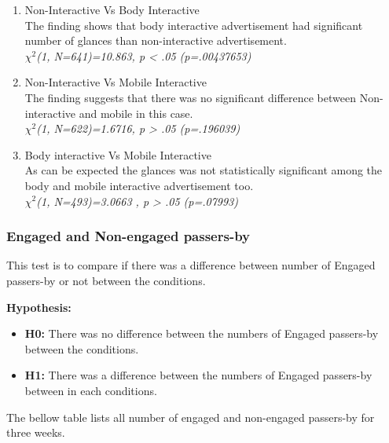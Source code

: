 \begin{enumerate}
\item Non-Interactive Vs Body Interactive \\
The finding shows that body interactive advertisement had significant number of glances than non-interactive advertisement. \\
${\chi}^2$\emph{(1, N=641)=10.863, p < .05 (p=.00437653)}



\item Non-Interactive Vs Mobile Interactive  \\
The finding suggests that there was no significant difference between Non-interactive and mobile in this case.\\
${\chi}^2$\emph{(1, N=622)=1.6716, p > .05 (p=.196039)}

\item Body interactive Vs Mobile Interactive \\
As can be expected the glances was not statistically significant among the body and mobile interactive advertisement too.\\
${\chi}^2$\emph{(1, N=493)=3.0663 , p > .05 (p=.07993)}

\end{enumerate}


\subsubsection {Engaged and Non-engaged passers-by}
This test is to compare if there was a difference between number of Engaged passers-by or not between the conditions.

\textbf{Hypothesis: }
\begin{itemize}
\item \textbf{H0:} There was no difference between the numbers of Engaged passers-by between the conditions.
\item \textbf{H1:} There was a difference between the numbers of Engaged passers-by between in each conditions.
\end{itemize}

The bellow table lists all number of engaged and non-engaged passers-by for three weeks.



